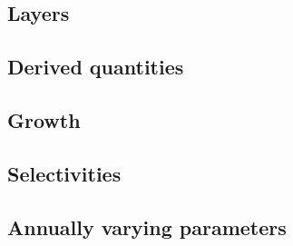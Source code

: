 \subsection{Layers}

\subsection{Derived quantities}

\subsection{Growth}

\subsection{Selectivities}

\subsection{Annually varying parameters}
